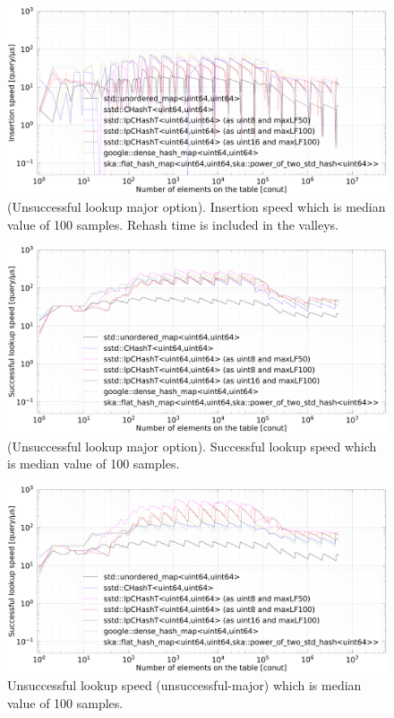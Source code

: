 \begin{figure}[h]
  \hspace{-3mm}
  \includegraphics[scale=0.24]{./fig_bench/insert_med.pdf}
  \caption{
    (Unsuccessful lookup major option). Insertion speed which is median value of 100 samples.
    Rehash time is included in the valleys.
  }
  \label{fig_bench_insert_um}
\end{figure}

\begin{figure}[h]
  \hspace{-3mm}
  \includegraphics[scale=0.24]{./fig_bench/find_successful_lookup_med.pdf}
  \caption{
    (Unsuccessful lookup major option). Successful lookup speed which is median value of 100 samples.
  }
  \label{fig_bench_find_s_um}
\end{figure}

\begin{figure}[h]
  \hspace{-3mm}
  \includegraphics[scale=0.24]{./fig_bench/find_unsuccessful_lookup_med.pdf}
  \caption{ Unsuccessful lookup speed (unsuccessful-major) which is median value of 100 samples. }
  \label{fig_bench_find_us_um}
\end{figure}

